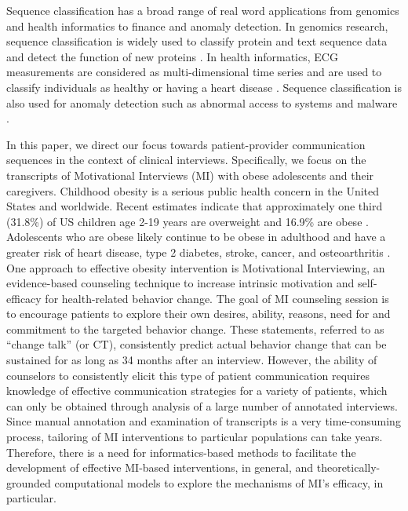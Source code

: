 \documentclass{amia_summit_2018}
\begin{document}
Sequence classification has a broad range of real word applications from genomics and health informatics to finance and anomaly detection. In genomics research, sequence classification is widely used to classify protein and text sequence data \cite{yakhnenko2005discriminatively} and detect the function of new proteins \cite{deshpande2002evaluation}. In health informatics, ECG measurements are considered as multi-dimensional time series and are used to classify individuals as healthy or having a heart disease \cite{wei2006semi}. Sequence classification is also used for anomaly detection such as abnormal access to systems \cite{lane1999temporal} and malware \cite{drew2017polymorphic}.    

In this paper, we direct our focus towards patient-provider communication sequences in the context of clinical interviews. Specifically, we focus on the transcripts of Motivational Interviews (MI) with obese adolescents and their caregivers. Childhood obesity is a serious public health concern in the United States and worldwide. Recent estimates indicate that approximately one third (31.8\%) of US children age 2-19 years are overweight and 16.9\% are obese \cite{ogden2012prevalence}. Adolescents who are obese likely continue to be obese in adulthood and have a greater risk of heart disease, type 2 diabetes, stroke, cancer, and osteoarthritis \cite{general2010surgeon}. One approach to effective obesity intervention is Motivational Interviewing, an evidence-based counseling technique to increase intrinsic motivation and self-efficacy for health-related behavior change. The goal of MI counseling session is to encourage patients to explore their own desires, ability, reasons, need for and commitment to the targeted behavior change. These statements, referred to as ``change talk'' (or CT), consistently predict actual behavior change that can be sustained for as long as 34 months after an interview. However, the ability of counselors to consistently elicit this type of patient communication requires knowledge of effective communication strategies for a variety of patients, which can only be obtained through analysis of a large number of annotated interviews. Since manual annotation and examination of transcripts is a very time-consuming process, tailoring of MI interventions to particular populations can take years. Therefore, there is a need for informatics-based methods to facilitate the development of effective MI-based interventions, in general, and theoretically-grounded computational models to explore the mechanisms of MI's efficacy, in particular.  
\end{document}
